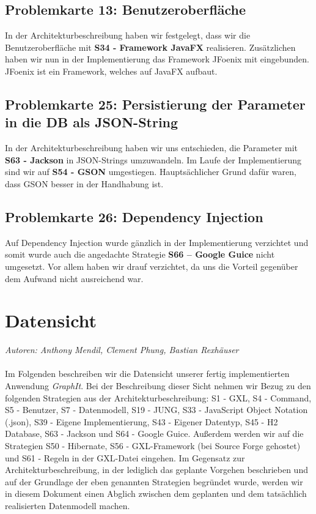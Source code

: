 \documentclass[enabledeprecatedfontcommands,fontsize=11pt,paper=a4,twoside]{scrartcl}
\begin{document}
\subsection{Problemkarte 13: Benutzeroberfläche}
In der Architekturbeschreibung haben wir festgelegt, dass wir die Benutzeroberfläche mit \textbf{S34 - Framework JavaFX} realisieren. Zusätzlichen haben wir nun in der Implementierung das Framework JFoenix mit eingebunden. JFoenix ist ein Framework, welches auf JavaFX aufbaut. \\


\subsection{Problemkarte 25: Persistierung der Parameter in die DB als JSON-String}
In der Architekturbeschreibung haben wir uns entschieden, die Parameter mit \textbf{S63 - Jackson} in JSON-Strings umzuwandeln. Im Laufe der Implementierung sind wir auf \textbf{S54 - GSON} umgestiegen. Hauptsächlicher Grund dafür waren, dass GSON besser in der Handhabung ist. \\


\subsection{Problemkarte 26: Dependency Injection}
Auf Dependency Injection wurde gänzlich in der Implementierung verzichtet und somit wurde auch die angedachte Strategie \textbf{S66 – Google Guice} nicht umgesetzt. Vor allem haben wir drauf verzichtet, da uns die Vorteil gegenüber dem Aufwand nicht ausreichend war. \\


\newpage
\section{Datensicht}
\label{sec:datensicht}

\emph{Autoren: Anthony Mendil, Clement Phung, Bastian Rexhäuser}\\ \\

Im Folgenden beschreiben wir die Datensicht unserer fertig implementierten Anwendung \textit{GraphIt}. Bei der Beschreibung dieser Sicht nehmen wir Bezug zu den folgenden Strategien aus der Architekturbeschreibung: S1 - GXL, S4 - Command, S5 - Benutzer, S7 - Datenmodell, S19 - JUNG, S33 - JavaScript Object Notation (.json), S39 - Eigene Implementierung, S43 - Eigener Datentyp, S45 - H2 Database, S63 - Jackson und S64 - Google Guice. Außerdem werden wir auf die Strategien S50 - Hibernate, S56 - GXL-Framework (bei Source Forge gehostet) und S61 - Regeln in der GXL-Datei eingehen. Im Gegensatz zur Architekturbeschreibung, in der lediglich das geplante Vorgehen beschrieben und auf der Grundlage der eben genannten Strategien begründet wurde, werden wir in diesem Dokument einen Abglich zwischen dem geplanten und dem tatsächlich realisierten Datenmodell machen. \\
\end{document}
